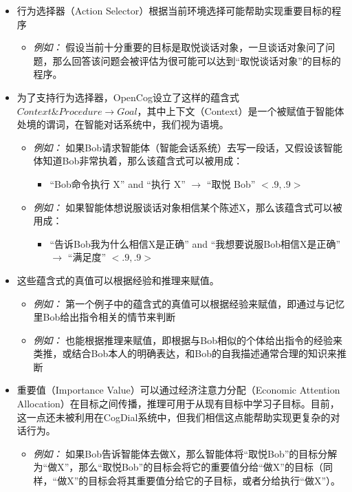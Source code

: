 \begin{itemize}
\item 行为选择器（Action Selector）根据当前环境选择可能帮助实现重要目标的程序
\begin{itemize}
\item {\it 例如：} 假设当前十分重要的目标是取悦谈话对象，一旦谈话对象问了问题，那么回答该问题会被评估为很可能可以达到“取悦谈话对象”的目标的程序。
\end{itemize}

\item 为了支持行为选择器，OpenCog设立了这样的蕴含式$Context \& Procedure \rightarrow Goal$，其中上下文（Context）是一个被赋值于智能体处境的谓词，在智能对话系统中，我们视为语境。

\begin{itemize}
\item {\it 例如：} 如果Bob请求智能体（智能会话系统）去写一段话，又假设该智能体知道Bob非常执着，那么该蕴含式可以被用成：
 \begin{itemize}
 \item ``Bob命令执行 X''  and ``执行 X''  $\rightarrow$ ``取悦 Bob''  $<.9,.9>$
 \end{itemize}

\item {\it 例如：} 如果智能体想说服谈话对象相信某个陈述X，那么该蕴含式可以被用成：
 \begin{itemize}
 \item ``告诉Bob我为什么相信X是正确''  and ``我想要说服Bob相信X是正确''  $\rightarrow$ ``满足度''  $<.9,.9>$
 \end{itemize}

\end{itemize}
\item 这些蕴含式的真值可以根据经验和推理来赋值。
\begin{itemize}
\item {\it 例如：} 第一个例子中的蕴含式的真值可以根据经验来赋值，即通过与记忆里Bob给出指令相关的情节来判断
\item {\it 例如：} 也能根据推理来赋值，即根据与Bob相似的个体给出指令的经验来类推，或结合Bob本人的明确表达，和Bob的自我描述通常合理的知识来推断
\end{itemize}

\item 重要值（Importance Value）可以通过经济注意力分配（Economic Attention Allocation）\cite{EGI2}在目标之间传播，推理可用于从现有目标中学习子目标。目前，这一点还未被利用在CogDial系统中，但我们相信这点能帮助实现更复杂的对话行为。
\begin{itemize}
\item {\it 例如：} 如果Bob告诉智能体去做X，那么智能体将“取悦Bob”的目标分解为“做X”，那么“取悦Bob”的目标会将它的重要值分给“做X”的目标（同样，“做X”的目标会将其重要值分给它的子目标，或者分给执行“做X”）。
\end{itemize}
\end{itemize}

